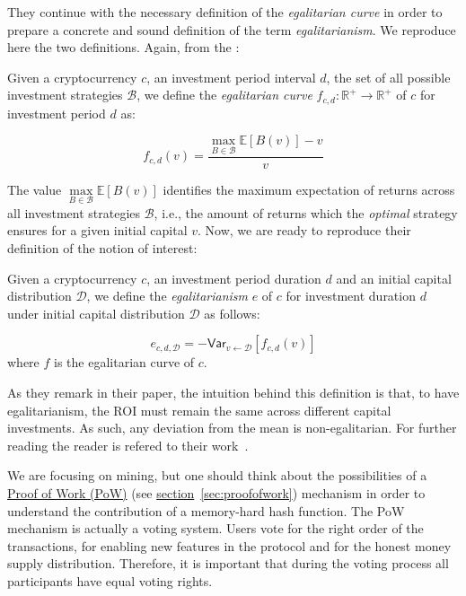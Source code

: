 They continue with the necessary definition of the \emph{egalitarian curve} in order to prepare a concrete and sound definition of the term \emph{egalitarianism}. We reproduce here the two definitions. Again, from the \cite{egalitarianism}:

\begin{definition}
    Given a cryptocurrency $c$, an investment period interval $d$, the set of
    all possible investment strategies $\mathcal{B}$, we define the \emph{egalitarian curve}
    $f_{c,d}: \mathbb{R}^+ \longrightarrow \mathbb{R}^+$ of $c$ for
    investment period $d$ as:

    \begin{equation} \nonumber
      f_{c,d}(v) = \frac{\underset{B \in \mathcal{B}}{\max}{\mathbb{E}[B(v)]} - v}{v}
    \end{equation}
\end{definition}

The value $\underset{B \in \mathcal{B}}{\max}{\mathbb{E}[B(v)]}$ identifies the maximum expectation of
returns across all investment strategies $\mathcal{B}$, i.e., the amount of
returns which the \emph{optimal} strategy ensures for a given initial capital $v$. Now, we are ready to reproduce their definition of the notion of interest:

\begin{definition}[Egalitarianism]
  Given a cryptocurrency $c$, an investment period duration $d$ and an initial
  capital distribution $\mathcal{D}$, we define the \emph{egalitarianism} $e$ of $c$
  for investment duration $d$ under initial capital distribution $\mathcal{D}$
  as follows:

  \begin{equation} \nonumber
    e_{c,d,\mathcal{D}} = -\textsf{Var}_{v \gets \mathcal{D}}[f_{c,d}(v)]
  \end{equation}
  where $f$ is the egalitarian curve of $c$.
\end{definition}

As they remark in their paper, the intuition behind this definition is that, to have egalitarianism, the ROI must remain the same across different capital investments. As such, any deviation from the mean is non-egalitarian. For further reading the reader is refered to their work~\cite{egalitarianism}.

We are focusing on mining, but one should think about the possibilities of a \hyperref[sec:proofofwork]{Proof of Work (PoW)} (see \hyperref[sec:proofofwork]{section}~\ref{sec:proofofwork}) mechanism in order to understand the contribution of a memory-hard hash function. The PoW mechanism is actually a voting system. Users vote for the right order of the transactions, for enabling new features in the protocol and for the honest money supply distribution. Therefore, it is important that during the voting process all participants have equal voting rights.

